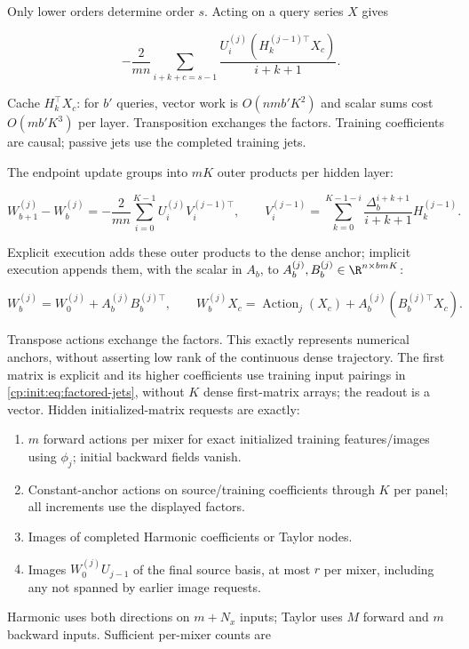Only lower orders determine order $s$. Acting on a query series $X$ gives

\begin{equation}
\label{cp:init:eq:cached-action}
-\frac2{mn}\sum_{i+k+c=s-1}
             \frac{U_i^{(j)}(H_k^{(j-1)\top}X_c)}{i+k+1}.
\end{equation}

Cache $H_k^\top X_c$: for $b'$ queries, vector work is
$O(nmb'K^2)$ and scalar sums cost $O(mb'K^3)$ per layer.
Transposition exchanges the factors. Training coefficients are causal;
passive jets use the completed training jets.

The endpoint update groups into $mK$ outer products per hidden layer:

\begin{equation}
\label{cp:init:eq:anchor-increment}
W_{b+1}^{(j)}-W_b^{(j)}
=-\frac2{mn}\sum_{i=0}^{K-1}U_i^{(j)}V_i^{(j-1)\top},\qquad
V_i^{(j-1)}=\sum_{k=0}^{K-1-i}
             \frac{\Delta_b^{i+k+1}}{i+k+1}H_k^{(j-1)}.
\end{equation}

Explicit execution adds these outer products to the dense anchor;
implicit execution appends them, with the scalar in $A_b$, to
$A_b^{(j)},B_b^{(j)}\in\R^{n\times bmK}$:

\begin{equation}
\label{cp:init:eq:implicit-anchor}
W_b^{(j)}=W_0^{(j)}+A_b^{(j)}B_b^{(j)\top},\qquad
W_b^{(j)}X_c=\operatorname{Action}_j(X_c)
                  +A_b^{(j)}(B_b^{(j)\top}X_c).
\end{equation}

Transpose actions exchange the factors. This exactly represents numerical
anchors, without asserting low rank of the continuous dense trajectory.
The first matrix is explicit and its higher coefficients use training
input pairings in \eqref{cp:init:eq:factored-jets}, without $K$ dense
first-matrix arrays; the readout is a vector. Hidden initialized-matrix
requests are exactly:

\begin{enumerate}
\item $m$ forward actions per mixer for exact initialized training
features/images using $\phi_j$; initial backward fields vanish.
\item Constant-anchor actions on source/training coefficients through $K$
per panel; all increments use the displayed factors.
\item Images of completed Harmonic coefficients or Taylor nodes.
\item Images $W_0^{(j)}U_{j-1}$ of the final source basis, at most
$r$ per mixer, including any not spanned by earlier image requests.
\end{enumerate}
Harmonic uses both directions on $m+N_x$ inputs; Taylor uses $M$
forward and $m$ backward inputs. Sufficient per-mixer counts are

